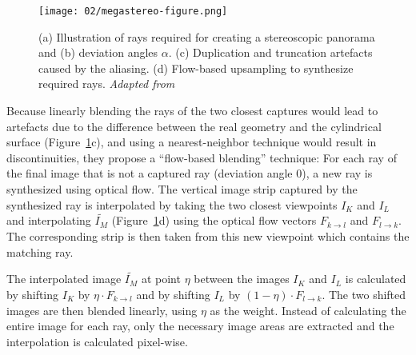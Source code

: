\begin{figure}[]
\centering
\texttt{[image: 02/megastereo-figure.png]}
\caption[Flow-based blending in Megastereo \cite{megastereo}]{(a) Illustration of rays required for creating a stereoscopic panorama and (b) deviation angles $\alpha$. (c) Duplication and truncation artefacts caused by the aliasing. (d) Flow-based upsampling to synthesize required rays. \emph{Adapted from \cite{megastereo}}}
\label{fig:megastereo}
\end{figure}

Because linearly blending the rays of the two closest captures would lead to artefacts due to the difference between the real geometry and the cylindrical surface (Figure~\ref{fig:megastereo}c), and using a nearest-neighbor technique would result in discontinuities, they propose a ``flow-based blending'' technique: For each ray of the final image that is not a captured ray (deviation angle 0), a new ray is synthesized using optical flow. The vertical image strip captured by the synthesized ray is interpolated by taking the two closest viewpoints $I_K$ and $I_L$ and interpolating $\widetilde{I_M}$ (Figure~\ref{fig:megastereo}d) using the optical flow vectors $F_{k\rightarrow l}$ and $F_{l\rightarrow k}$.  The corresponding strip is then taken from this new viewpoint which contains the matching ray.



The interpolated image $\widetilde{I_M}$ at point $\eta$ between the images $I_K$ and $I_L$ is calculated by shifting $I_K$ by $\eta \cdot F_{k\rightarrow l}$ and by shifting $I_L$ by $(1 - \eta) \cdot F_{l\rightarrow k}$. The two shifted images are then blended linearly, using $\eta$ as the weight. Instead of calculating the entire image for each ray, only the necessary image areas are extracted and the interpolation is calculated pixel-wise.

